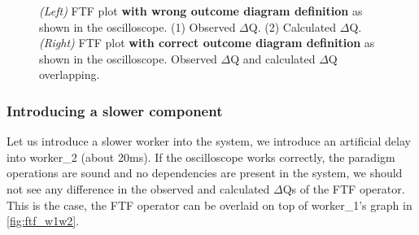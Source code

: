 \begin{figure}[H]
\begin{subfigure}{.5\textwidth}
                    \label{fig:good}%
                \end{subfigure}%
                \caption{\textit{(Left)} FTF plot \textbf{with wrong outcome diagram definition} as shown in the oscilloscope. (1) Observed $\Delta$Q. (2) Calculated $\Delta$Q. \\
                \textit{(Right)} FTF plot \textbf{with correct outcome diagram definition} as shown in the oscilloscope. Observed $\Delta$Q and calculated $\Delta$Q overlapping.}
                \label{fig:ftf_osc}%
            \end{figure}%
              \subsubsection{Introducing a slower component}
            Let us introduce a slower worker into the system, we introduce an artificial delay into worker\_2 (about 20ms). If the oscilloscope works correctly, the paradigm operations are sound and no dependencies are present in the system, we should not see any difference in the observed and calculated $\Delta$Qs of the FTF operator. This is the case, the FTF operator can be overlaid on top of worker\_1's graph in \ref{fig:ftf_w1w2}.

